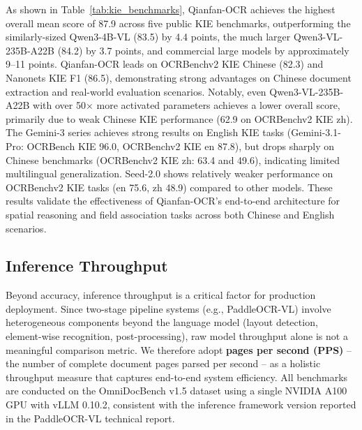 \documentclass[dvipsnames]{article}
\begin{document}
As shown in Table~\ref{tab:kie_benchmarks}, Qianfan-OCR achieves the highest overall mean score of 87.9 across five public KIE benchmarks, outperforming the similarly-sized Qwen3-4B-VL (83.5) by 4.4 points, the much larger Qwen3-VL-235B-A22B (84.2) by 3.7 points, and commercial large models by approximately 9--11 points. Qianfan-OCR leads on OCRBenchv2 KIE Chinese (82.3) and Nanonets KIE F1 (86.5), demonstrating strong advantages on Chinese document extraction and real-world evaluation scenarios. Notably, even Qwen3-VL-235B-A22B with over 50$\times$ more activated parameters achieves a lower overall score, primarily due to weak Chinese KIE performance (62.9 on OCRBenchv2 KIE zh). The Gemini-3 series achieves strong results on English KIE tasks (Gemini-3.1-Pro: OCRBench KIE 96.0, OCRBenchv2 KIE en 87.8), but drops sharply on Chinese benchmarks (OCRBenchv2 KIE zh: 63.4 and 49.6), indicating limited multilingual generalization. Seed-2.0 shows relatively weaker performance on OCRBenchv2 KIE tasks (en 75.6, zh 48.9) compared to other models. These results validate the effectiveness of Qianfan-OCR's end-to-end architecture for spatial reasoning and field association tasks across both Chinese and English scenarios.

\subsection{Inference Throughput}

Beyond accuracy, inference throughput is a critical factor for production deployment. Since two-stage pipeline systems (e.g., PaddleOCR-VL) involve heterogeneous components beyond the language model (layout detection, element-wise recognition, post-processing), raw model throughput alone is not a meaningful comparison metric. We therefore adopt \textbf{pages per second (PPS)} -- the number of complete document pages parsed per second -- as a holistic throughput measure that captures end-to-end system efficiency. All benchmarks are conducted on the OmniDocBench v1.5 dataset using a single NVIDIA A100 GPU with vLLM 0.10.2, consistent with the inference framework version reported in the PaddleOCR-VL technical report.
\end{document}
